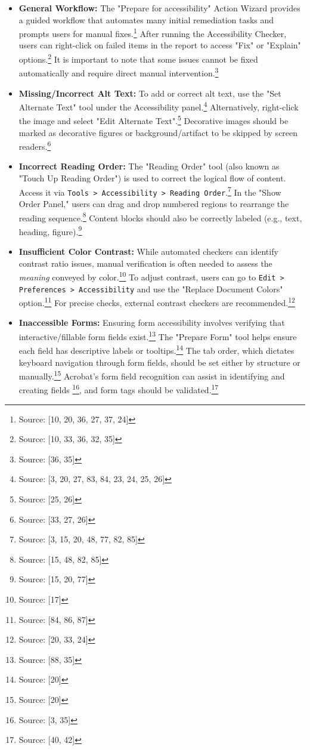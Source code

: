 \begin{itemize}[noitemsep,topsep=0pt]
    \item \textbf{General Workflow:} The "Prepare for accessibility" Action Wizard provides a guided workflow that automates many initial remediation tasks and prompts users for manual fixes.\footnote{Source: [10, 20, 36, 27, 37, 24]} After running the Accessibility Checker, users can right-click on failed items in the report to access "Fix" or "Explain" options.\footnote{Source: [10, 33, 36, 32, 35]} It is important to note that some issues cannot be fixed automatically and require direct manual intervention.\footnote{Source: [36, 35]}
    \item \textbf{Missing/Incorrect Alt Text:} To add or correct alt text, use the "Set Alternate Text" tool under the Accessibility panel.\footnote{Source: [3, 20, 27, 83, 84, 23, 24, 25, 26]} Alternatively, right-click the image and select "Edit Alternate Text".\footnote{Source: [25, 26]} Decorative images should be marked as decorative figures or background/artifact to be skipped by screen readers.\footnote{Source: [33, 27, 26]}
    \item \textbf{Incorrect Reading Order:} The "Reading Order" tool (also known as "Touch Up Reading Order") is used to correct the logical flow of content. Access it via \texttt{Tools > Accessibility > Reading Order}.\footnote{Source: [3, 15, 20, 48, 77, 82, 85]} In the "Show Order Panel," users can drag and drop numbered regions to rearrange the reading sequence.\footnote{Source: [15, 48, 82, 85]} Content blocks should also be correctly labeled (e.g., text, heading, figure).\footnote{Source: [15, 20, 77]}
    \item \textbf{Insufficient Color Contrast:} While automated checkers can identify contrast ratio issues, manual verification is often needed to assess the \textit{meaning} conveyed by color.\footnote{Source: [17]} To adjust contrast, users can go to \texttt{Edit > Preferences > Accessibility} and use the "Replace Document Colors" option.\footnote{Source: [84, 86, 87]} For precise checks, external contrast checkers are recommended.\footnote{Source: [20, 33, 24]}
    \item \textbf{Inaccessible Forms:} Ensuring form accessibility involves verifying that interactive/fillable form fields exist.\footnote{Source: [88, 35]} The "Prepare Form" tool helps ensure each field has descriptive labels or tooltips.\footnote{Source: [20]} The tab order, which dictates keyboard navigation through form fields, should be set either by structure or manually.\footnote{Source: [20]} Acrobat's form field recognition can assist in identifying and creating fields \footnote{Source: [3, 35]}, and form tags should be validated.\footnote{Source: [40, 42]}

\end{itemize}
